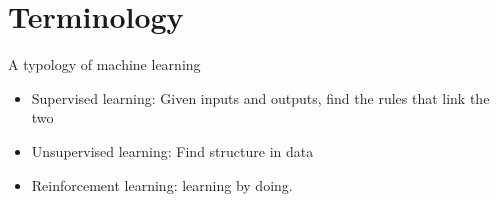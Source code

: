 \documentclass[color=usenames,dvipsnames]{beamer}
\begin{document}
\section{Terminology}


\begin{frame}{A typology of machine learning} 


\begin{itemize}
	
	\item Supervised learning: Given inputs and outputs, find the rules that link the two
	\item Unsupervised learning: Find structure in data
	\item Reinforcement learning: learning by doing.
	
\end{itemize}

\end{frame}
\end{document}
